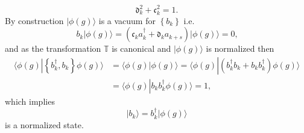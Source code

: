\documentclass[aps, preprint]{revtex4}
\begin{document}
\begin{equation*}\mathfrak{d}_{k}^{2} +\mathfrak{c}_{k}^{2} =1.
\end{equation*}By construction $\vert \phi  \left (g\right ) \rangle $ is a vacuum for $\left \{b_{k}\right \}$ i.e.
\begin{equation*}b_{k}\vert \phi  \left (g\right ) \rangle  =\left (\mathfrak{c}_{k} a_{k}^{ \dag } +\mathfrak{d}_{k} a_{k +s}\right )\vert \phi  \left (g\right ) \rangle  =0\text{,}
\end{equation*}and as the transformation $\mathbb{T}$ is canonical and $\vert \phi  \left (g\right ) \rangle $ is normalized then
\begin{align*} \langle \phi  \left (g\right )\left \vert \left \{b_{k}^{ \dag } ,b_{k}\right \}\phi  \left (g\right )\right . \rangle  &  = \langle \phi  \left (g\right )\left \vert \phi  \left (g\right )\right . \rangle  = \langle \phi  \left (g\right )\left \vert \left (b_{k}^{ \dag } b_{k} +b_{k} b_{k}^{ \dag }\right ) \phi  \left (g\right )\right . \rangle  \\
 &  = \langle \phi  \left (g\right )\left \vert b_{k} b_{k}^{ \dag } \phi  \left (g\right )\right . \rangle  =1\text{,}\end{align*}which implies
\begin{equation*}\vert b_{k} \rangle  =b_{k}^{ \dag }\vert \phi  \left (g\right ) \rangle 
\end{equation*}is a normalized state. 
\end{document}
